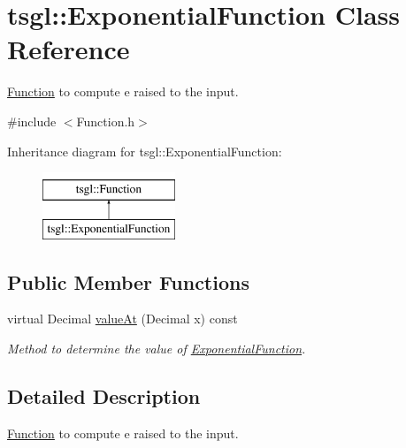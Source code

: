 \hypertarget{classtsgl_1_1_exponential_function}{\section{tsgl\-:\-:Exponential\-Function Class Reference}
\label{classtsgl_1_1_exponential_function}
}


\hyperlink{classtsgl_1_1_function}{Function} to compute e raised to the input.  




{\ttfamily \#include $<$Function.\-h$>$}

Inheritance diagram for tsgl\-:\-:Exponential\-Function\-:\begin{figure}[H]
\begin{center}
\leavevmode
\includegraphics[height=2.000000cm]{classtsgl_1_1_exponential_function}
\end{center}
\end{figure}
\subsection*{Public Member Functions}
\begin{DoxyCompactItemize}
\item 
virtual Decimal \hyperlink{classtsgl_1_1_exponential_function_a059eae7c56a61c73b4c545b6c0e309d9}{value\-At} (Decimal x) const 
\begin{DoxyCompactList}\small\item\em Method to determine the value of \hyperlink{classtsgl_1_1_exponential_function}{Exponential\-Function}. \end{DoxyCompactList}\end{DoxyCompactItemize}


\subsection{Detailed Description}
\hyperlink{classtsgl_1_1_function}{Function} to compute e raised to the input. 

